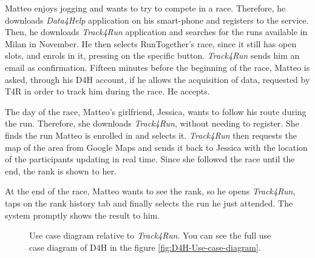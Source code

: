         Matteo enjoys jogging and wants to try to compete in a race. Therefore, he downloads \emph{Data4Help} application on his smart-phone and registers to the service. Then, he downloads \emph{Track4Run} application and searches for the runs available in Milan in November. He then selects RunTogether's race, since it still has open slots, and enrols in it, pressing on the specific button. \emph{Track4Run} sends him an email as confirmation.
        Fifteen minutes before the beginning of the race, Matteo is asked, through his D4H account, if he allows the acquisition of data, requested by T4R in order to track him during the race. He accepts.
        
        The day of the race, Matteo's girlfriend, Jessica, wants to follow his route during the run. Therefore, she downloads \emph{Track4Run}, without needing to register. She finds the run Matteo is enrolled in and selects it. \emph{Track4Run} then requests the map of the area from Google Maps and sends it back to Jessica with the location of the participants updating in real time. Since she followed the race until the end, the rank is shown to her.
        
        At the end of the race, Matteo wants to see the rank, so he opens \emph{Track4Run}, taps on the rank history tab and finally selects the run he just attended. The system promptly shows the result to him.
        
        \begin{figure}[H]
            \centering
            \caption{Use case diagram relative to \emph{Track4Run}. You can see the full use case diagram of D4H in the figure \ref{fig:D4H-Use-case-diagram}.}
            \label{fig:T4R-Use-case-diagram}
        \end{figure}        
        

